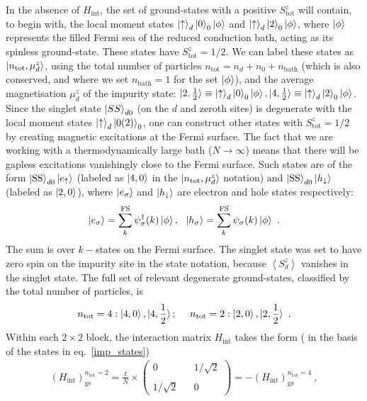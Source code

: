 \documentclass{iopart}
\begin{document}
In the absence of \(H_\text{int}\), the set of ground-states with a positive \(S_\text{tot}^z\) will contain, to begin with, the local moment states \(\ket{\uparrow}_d\ket{0}_0\ket{\phi}\) and \(\ket{\uparrow}_d\ket{2}_0\ket{\phi}\), where \(\ket{\phi}\) represents the filled Fermi sea of the reduced conduction bath, acting as its spinless ground-state. These states have \(S_\text{tot}^z = 1/2\). We can label these states as \(\ket{n_\text{tot}, \mu_d^z}\), using the total number of particles \(n_\text{tot} = n_d + n_0 + n_\text{bath}\) (which is also conserved, and where we set \(n_\text{bath} = 1\) for the set \(\ket{\phi}\)), and the average magnetisation \(\mu_d^z\) of the impurity state: \(\ket{2,\frac{1}{2}} \equiv \ket{\uparrow}_d\ket{0}_0\ket{\phi}, \ket{4,\frac{1}{2}} \equiv \ket{\uparrow}_d\ket{2}_0\ket{\phi}\). Since the singlet state \(\ket{SS}_{d0}\) (on the \(d\) and zeroth sites) is degenerate with the local moment states \(\ket{\uparrow}_d\ket{0(2)}_0\), one can construct other states with \(S_\text{tot}^z = 1/2\) by creating magnetic excitations at the Fermi surface. The fact that we are working with a thermodynamically large bath (\(N \to \infty\)) means that there will be gapless excitations vanishingly close to the Fermi surface. Such states are of the form \(\ket{\text{SS}}_{d0}\ket{e_\uparrow}\) (labeled as \(\ket{4,0}\) in the \(\ket{n_\text{tot}, \mu_d^z}\) notation) and \(\ket{\text{SS}}_{d0}\ket{h_\downarrow}\) (labeled as \(\ket{2,0}\)), where \(\ket{e_\sigma}\) and \(\ket{h_\downarrow}\) are electron and hole states respectively:
\begin{eqnarray}
	\ket{e_\sigma} = \sum_k^\text{FS} \psi^\dagger_\sigma(k)\ket{\phi}, ~ ~\ket{h_\sigma} = \sum_k^\text{FS} \psi_\sigma(k)\ket{\phi}~.
\end{eqnarray}
The sum is over \(k-\)states on the Fermi surface. The singlet state was set to have zero spin on the impurity site in the state notation, because \(\left<S_d^z \right>\) vanishes in the singlet state. The full set of relevant degenerate ground-states, classified by the total number of particles, is
\begin{eqnarray}
	n_\text{tot} = 4: \ket{4, 0}, \ket{4, \frac{1}{2}}; ~ ~ ~ ~ n_\text{tot} = 2: \ket{2,0}, \ket{2, \frac{1}{2}}\label{imp_states}~.
\end{eqnarray}
Within each \(2\times 2\) block, the interaction matrix \(H_\text{int}\) takes the form ( in the basis of the states in eq.~\eqref{imp_states})
\begin{eqnarray}
	 \left(H_\text{int}\right)_\text{gs}^{n_\text{tot}=2} = \frac{t}{N} \times \begin{pmatrix}0 && 1/\sqrt 2 \\ \\ 1/\sqrt 2 && 0\end{pmatrix} = -\left(H_\text{int}\right)_\text{gs}^{n_\text{tot}=4}~,
\end{eqnarray}
\end{document}
